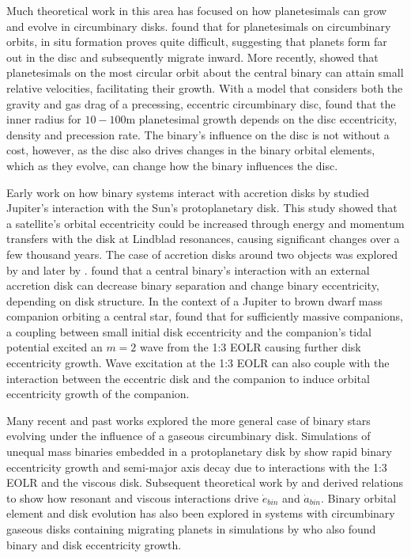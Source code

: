 Much theoretical work in this area has focused on how planetesimals
can grow and evolve in circumbinary disks.  \citet{Paardekooper2012}
found that for planetesimals on circumbinary orbits, in situ formation
proves quite difficult, suggesting that planets form far out in the
disc and subsequently migrate inward.  More recently, \citet{Bromley2015}
showed that planetesimals on the most circular orbit about the central
binary can attain small relative velocities, facilitating their growth.
With a model that considers both the gravity and gas drag of a
precessing, eccentric circumbinary disc, \citet{Silsbee2015a} found that
the inner radius for $10-100$m planetesimal growth depends on the disc eccentricity, density and precession rate.  The binary's influence on the disc is not without a cost, however, as the disc also drives changes in the binary orbital elements, which as they evolve, can change how the binary influences the disc.

Early work on how binary systems interact with accretion disks by \citet{Goldreich1980} studied Jupiter's interaction with the Sun's protoplanetary disk.  This study showed that a satellite's orbital eccentricity could be increased through energy and momentum transfers with the disk at Lindblad resonances, causing significant changes over a few thousand years.  The case of accretion disks around two objects was explored by \citet{Pringle1991} and later by \citet{Papaloizou2001}.  \citet{Pringle1991} found that a central binary's interaction with an external accretion disk can decrease binary separation and change binary eccentricity, depending on disk structure.  In the context of a Jupiter to brown dwarf mass companion orbiting a central star,  \citet{Papaloizou2001} found that for sufficiently massive companions, a coupling between small initial disk eccentricity and the companion's
tidal potential excited an $m = 2$ wave from the 1:3 EOLR causing further disk eccentricity growth.  Wave excitation at the 1:3 EOLR can also couple with the interaction between the eccentric disk and the companion to induce orbital eccentricity growth of the companion.  

Many recent and past works explored the more general case of binary stars evolving under the influence of a gaseous circumbinary disk.  Simulations of unequal mass binaries embedded in a protoplanetary disk by \citet{Artymowicz1991} show rapid binary eccentricity growth and semi-major axis decay due to interactions with the 1:3 EOLR and the viscous disk.  Subsequent theoretical work by \citet{Artymowicz1996b} and \citet{Artymowicz2000} derived relations to show how resonant and viscous interactions drive $\dot{e}_{bin}$ and $\dot{a}_{bin}$.  Binary orbital element and disk evolution has also been explored in systems with circumbinary gaseous disks containing migrating planets in simulations by \citet{Pierens2007} who also found binary and disk eccentricity growth.

